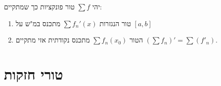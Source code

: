 \documentclass{tstextbook}
\begin{document}
\begin{proposition}
יהי \(\sum f\) טור פונקציות כך שמתקיים:

  \begin{enumerate}
    \item טור הנגזרות  \(\sum f_n'(x)\) מתכנס במ"ש על \([a,b]\)


    \item הטור \(\sum f_n(x_0)\) מתכנס נקודתית 
אזי מתקיים \(\left( \sum f_{n} \right)'=\sum(f'_{n})\).


  \end{enumerate}
\end{proposition}
\section{טורי חזקות}
\end{document}
